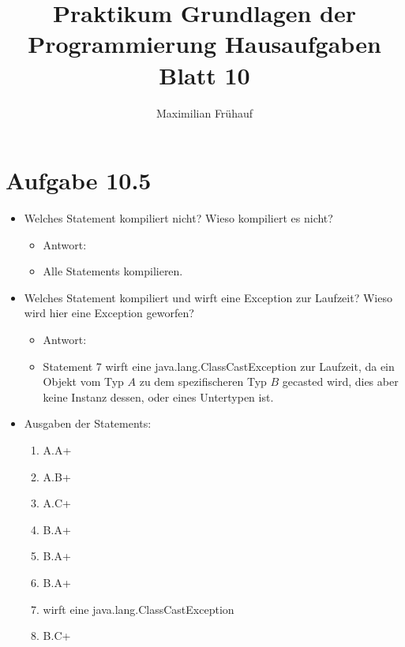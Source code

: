 \documentclass[a4paper, 10pt]{article}
\title{Praktikum Grundlagen der Programmierung Hausaufgaben Blatt 10}
\author{Maximilian Frühauf}
\begin{document}
\maketitle
\section{Aufgabe 10.5}
\begin{itemize}
	\item Welches Statement kompiliert nicht? Wieso kompiliert es nicht?
	      \begin{itemize}
		      \item[] Antwort:
		      \item[] Alle Statements kompilieren.
	      \end{itemize}
	\item Welches Statement kompiliert und wirft eine Exception zur Laufzeit? Wieso wird hier eine Exception geworfen?
	      \begin{itemize}
		      \item[] Antwort:
		      \item[] Statement 7 wirft eine java.lang.ClassCastException zur Laufzeit, da ein Objekt vom
		            Typ \( A \) zu dem spezifischeren Typ \( B \) gecasted wird, dies aber keine Instanz dessen,
		            oder eines Untertypen ist.
	      \end{itemize}
	\item Ausgaben der Statements:
	      \begin{enumerate}
		      \item A.A+
		      \item A.B+
		      \item A.C+
		      \item B.A+
		      \item B.A+
		      \item B.A+
		      \item wirft eine java.lang.ClassCastException
		      \item B.C+
	      \end{enumerate}
\end{itemize}
\end{document}
